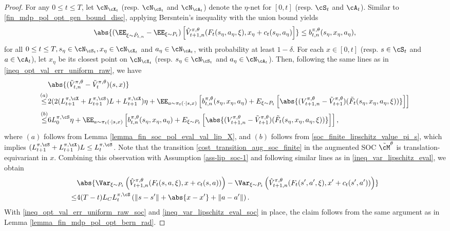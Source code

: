 \documentclass[9pt]{article}
\numberwithin{equation}{section}
\begin{document}
\begin{proof}
    For any $0 \leq t \leq T$, let $\cN_{\cX_t}$ (resp. $\cN_{\cS_t}$ and $\cN_{\cA_t}$) denote the $\eta$-net for $[0,t]$ (resp. $\cS_t$ and $\cA_t$). Similar to \eqref{fin_mdp_pol_opt_gen_bound_disc}, applying Bersntein's inequality with the union bound yields
    \begin{align}
        \abs{(\EE_{\xi \sim \hat{P}_{t,n}} - \EE_{\xi \sim P_t})\left[\hat{V}_{t+1,n}^{\pi, \theta}(F_t(s_\eta,a_\eta,\xi), x_\eta + c_t(s_\eta,a_\eta)\right]} \leq b_{t,n}^{\pi, \theta}(s_\eta, x_\eta, a_\eta), \label{fin_soc_pol_opt_gen_bound_disc}
    \end{align}
    for all $0 \leq t \leq T, s_\eta \in \cN_{\cS_t}, x_\eta \in \cN_{\cX_t}$ and $a_\eta \in \cN_{\cA_t}$, with probability at least $1-\delta$. For each $x \in [0,t]$ (resp. $s \in \cS_t$ and $a \in \cA_t$), let $x_\eta$ be its closest point on $\cN_{\cX_t}$ (resp. $s_\eta \in \cN_{\cS_t}$ and $a_\eta \in \cN_{\cA_t}$). Then, following the same lines as in \eqref{ineq_opt_val_err_uniform_raw}, we have
    \begin{align}
        & \abs{(\tilde{V}_{t,n}^{\pi, \theta} - \tilde{V}_t^{\pi, \theta})(s,x)} \nonumber \\
        \overset{(a)}{\leq} & 2(2(L_{t+1}^{\pi, \cX} + L_{t+1}^{\pi, \cS})L + L_{t+1}^{\pi, \cX})\eta + \EE_{a \sim \pi_t(\cdot|s,x)}\left[ b_{t,n}^{\pi, \theta}(s_\eta, x_\eta, a_\eta) + E_{\xi \sim P_t} \left[ \abs{(V_{t+1, n}^{\pi, \theta} - \tilde{V}_{t+1}^{\pi, \theta})(\tilde{F}_t(s_\eta,x_\eta,a_\eta,\xi))}\right]\right] \nonumber \\
        \overset{(b)}{\leq} & 6L_0^{\pi, \cS} \eta + \EE_{a \sim \pi_t(\cdot|s,x)}\left[ b_{t,n}^{\pi, \theta}(s_\eta, x_\eta, a_\eta) + E_{\xi \sim P_t} \left[ \abs{(V_{t+1, n}^{\pi, \theta} - \tilde{V}_{t+1}^{\pi, \theta})(\tilde{F}_t(s_\eta,x_\eta,a_\eta,\xi))}\right]\right], \label{ineq_opt_val_err_uniform_raw_soc}
    \end{align}
    where $(a)$ follows from Lemma \ref{lemma_fin_soc_pol_eval_val_lip_X}, and $(b)$ follows from \eqref{soc_finite_lipschitz_value_pi_s}, which implies $(L_{t+1}^{\pi, \cS} + L_{t+1}^{\pi, \cX})L \leq L_t^{\pi, \cS}$. Note that the transition \eqref{cost_transition_aug_soc_finite} in the augmented SOC $\tilde{\cM}^\theta$ is translation-equivariant in $x$.
    Combining this observation with Assumption \ref{ass-lip_soc-1} and following similar lines as in \eqref{ineq_var_lipschitz_eval}, we obtain
    \begin{align}
        & \abs{\Var_{\xi \sim P_t}\left(\hat{V}_{t+1,n}^{\pi,\theta}(F_t(s,a,\xi), x + c_t(s,a))\right) - \Var_{\xi \sim P_t}\left(\hat{V}_{t+1,n}^{\pi,\theta}(F_t(s',a',\xi), x' + c_t(s',a'))\right)} \nonumber \\
        \leq & 4(T-t) L_C L_t^{\pi, \cS}\left(\|s-s'\| +  \abs{x-x'} + \|a - a'\|\right). \label{ineq_var_lipschitz_eval_soc}
    \end{align}
    With \eqref{ineq_opt_val_err_uniform_raw_soc} and \eqref{ineq_var_lipschitz_eval_soc} in place, the claim follows from the same argument as in Lemma \ref{lemma_fin_mdp_pol_opt_bern_rad}.
\end{proof}
\end{document}
